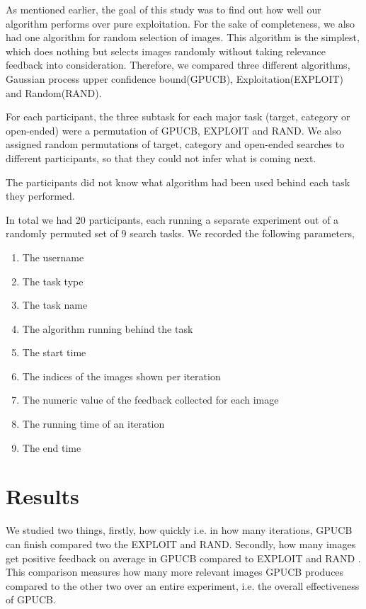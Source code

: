 \documentclass[english]{tktltiki}
\begin{document}
As mentioned earlier, the goal of this study was to find out how well our algorithm performs over pure exploitation. For the sake of completeness, we also had one algorithm for random selection of images. This algorithm is the simplest, which does nothing but selects images randomly without taking relevance feedback into consideration. Therefore, we compared three different algorithms, Gaussian process upper confidence bound(GPUCB), Exploitation(EXPLOIT) and Random(RAND).

For each participant, the three subtask for each major task (target, category or open-ended) were a permutation of GPUCB, EXPLOIT and RAND. We also assigned random permutations of target, category and open-ended searches to different participants, so that they could not infer what is coming next.

The participants did not know what algorithm had been used behind each task they performed.

In total we had 20 participants, each running a separate experiment out of a randomly permuted set of 9 search tasks. We recorded the following parameters,

\begin{enumerate}
	\item The username
	\item The task type
	\item The task name
	\item The algorithm running behind the task
	\item The start time
	\item The indices of the images shown per iteration
	\item The numeric value of the feedback collected for each image
	\item The running time of an iteration
	\item The end time
\end{enumerate}

\section{Results}

We studied two things, firstly, how quickly i.e. in how many iterations, GPUCB can finish compared two the EXPLOIT and RAND. Secondly, how many images get positive feedback on average in GPUCB compared to EXPLOIT and RAND \cite{explor_exploit_img_ret}. This comparison measures how many more relevant images GPUCB produces compared to the other two over an entire experiment, i.e. the overall effectiveness of GPUCB.
\end{document}
